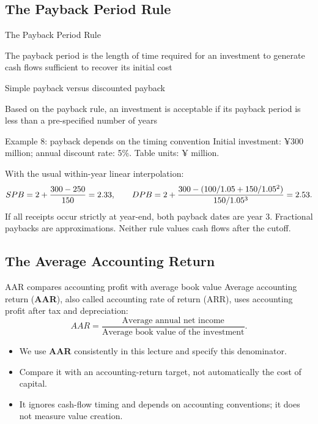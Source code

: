 \documentclass[9pt,aspectratio=169]{beamer}
\newenvironment{wideitemize}{\itemize\addtolength{\itemsep}{10pt}}{\enditemize}
\begin{document}
\subsection{The Payback Period Rule}

\begin{frame}{The Payback Period Rule}
\begin{wideitemize}
\item The payback period is the length of time required for an investment to generate cash flows sufficient to recover its initial cost
\item Simple payback versus discounted payback
\item Based on the payback rule, an investment is acceptable if its payback period is less than a pre-specified number of years
\end{wideitemize}
\end{frame}

\begin{frame}{Example 8: payback depends on the timing convention}
Initial investment: ¥300 million; annual discount rate: 5\%. Table units: ¥ million.
\begin{center}\end{center}
With the usual within-year linear interpolation:
\[
SPB=2+\frac{300-250}{150}=2.33,\qquad
DPB=2+\frac{300-(100/1.05+150/1.05^2)}{150/1.05^3}=2.53.
\]
If all receipts occur strictly at year-end, both payback dates are year 3. Fractional paybacks are approximations. Neither rule values cash flows after the cutoff.
\end{frame}

\subsection{The Average Accounting Return}

\begin{frame}{AAR compares accounting profit with average book value}
Average accounting return (\textbf{AAR}), also called accounting rate of return (ARR), uses accounting profit after tax and depreciation:
\[
AAR=\frac{\text{Average annual net income}}{\text{Average book value of the investment}}.
\]
\begin{itemize}
\item We use \textbf{AAR} consistently in this lecture and specify this denominator.
\item Compare it with an accounting-return target, not automatically the cost of capital.
\item It ignores cash-flow timing and depends on accounting conventions; it does not measure value creation.
\end{itemize}
\end{frame}
\end{document}
